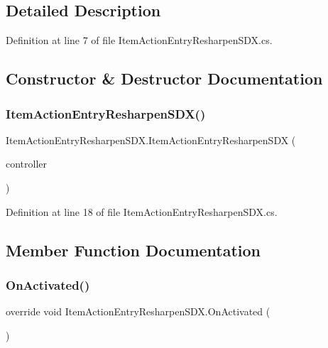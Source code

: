 \subsection{Detailed Description}


Definition at line 7 of file Item\+Action\+Entry\+Resharpen\+S\+D\+X.\+cs.



\subsection{Constructor \& Destructor Documentation}
\mbox{\label{class_item_action_entry_resharpen_s_d_x_ac0907b467043c8677f1f4e520cb5015f}} 
\subsubsection{\texorpdfstring{ItemActionEntryResharpenSDX()}{ItemActionEntryResharpenSDX()}}
{\footnotesize\ttfamily Item\+Action\+Entry\+Resharpen\+S\+D\+X.\+Item\+Action\+Entry\+Resharpen\+S\+DX (\begin{DoxyParamCaption}\item[{X\+Ui\+Controller}]{controller }\end{DoxyParamCaption})}



Definition at line 18 of file Item\+Action\+Entry\+Resharpen\+S\+D\+X.\+cs.



\subsection{Member Function Documentation}
\mbox{\label{class_item_action_entry_resharpen_s_d_x_a00ee6e81481137ca604764d88963df02}} 
\subsubsection{\texorpdfstring{OnActivated()}{OnActivated()}}
{\footnotesize\ttfamily override void Item\+Action\+Entry\+Resharpen\+S\+D\+X.\+On\+Activated (\begin{DoxyParamCaption}{ }\end{DoxyParamCaption})}



